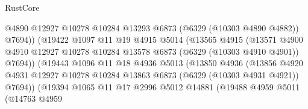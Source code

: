 \begin{lexlean}{RustCore}
\begin{coremodule}
                                      @4890
                                      @12927
                                      @10278
                                      @10284
                                      @13293
                                      @6873
                                      (@6329 (@10303 @4890 @4882))
                                      @7694))
                                  (@19422
                                    @1097
                                    @11
                                    @19
                                    @4915
                                    @5014
                                    (@13565
                                      @4915
                                      (@13571
                                        @4900
                                        @4910
                                        @12927
                                        @10278
                                        @10284
                                        @13578
                                        @6873
                                        (@6329 (@10303 @4910 @4901))
                                        @7694))
                                    (@19443
                                      @1096
                                      @11
                                      @18
                                      @4936
                                      @5013
                                      (@13850
                                        @4936
                                        (@13856
                                          @4920
                                          @4931
                                          @12927
                                          @10278
                                          @10284
                                          @13863
                                          @6873
                                          (@6329 (@10303 @4931 @4921))
                                          @7694))
                                      (@19394
                                        @1065
                                        @11
                                        @17
                                        @2996
                                        @5012
                                        @14881
                                        (@19488
                                          @4959
                                          @5011
                                          (@14763
                                            @4959

\end{coremodule}
\end{lexlean}
